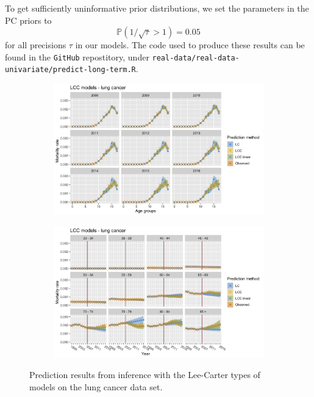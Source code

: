 \newpar To get sufficiently uninformative prior distributions, we set the parameters in the PC priors to
\begin{equation*}
    \mathbb{P}(1/\sqrt{\tau} > 1) = 0.05
\end{equation*}
for all precisions $\tau$ in our models. The code used to produce these results can be found in the \texttt{GitHub} repostitory, under \texttt{real-data/real-data-univariate/predict-long-term.R}. 

\begin{figure}[h!]
    \centering
    \begin{subfigure}[b]{.45\linewidth}
        \includegraphics[width=\linewidth]{real-data/real-data-univariate/Figures/univariate-LCC-by-age-lung.png}
    \end{subfigure}
    \begin{subfigure}[b]{.45\linewidth}
        \includegraphics[width=\linewidth]{real-data/real-data-univariate/Figures/univariate-LCC-by-period-lung.png}
    \end{subfigure}
    \caption{Prediction results from inference with the Lee-Carter types of models on the lung cancer data set.}
    \label{fig:uv-LCC-lung}
\end{figure}

